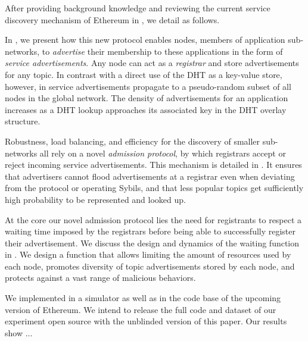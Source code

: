 After providing background knowledge and reviewing the current service discovery mechanism of Ethereum in , we detail \sysname as follows.

In , we present how this new protocol enables nodes, members of application sub-networks, to \emph{advertise} their membership to these applications in the form of \emph{service advertisements}.
Any node can act as a \emph{registrar} and store advertisements for any topic.
In contrast with a direct use of the DHT as a key-value store, however, in \sysname service advertisements propagate to a pseudo-random subset of all nodes in the global network.
The density of advertisements for an application increases as a DHT lookup approaches its associated key in the DHT overlay structure.

Robustness, load balancing, and efficiency for the discovery of smaller sub-networks all rely on a novel \emph{admission protocol}, by which registrars accept or reject incoming service advertisements.
This mechanism is detailed in .
It ensures that advertisers cannot flood advertisements at a registrar even when deviating from the protocol or operating Sybils, and that less popular topics get sufficiently high probability to be represented and looked up.  

At the core our novel admission protocol lies the need for registrants to respect a waiting time imposed by the registrars before being able to successfully register their advertisement.
We discuss the design and dynamics of the waiting function in .
We design a function that allows limiting the amount of resources used by each node, promotes diversity of topic advertisements stored by each node, and protects against a vast range of malicious behaviors.

We implemented \sysname in a simulator as well as in the code base of the upcoming version of Ethereum.
We intend to release the full code and dataset of our experiment open source with the unblinded version of this paper.
Our results show ...

